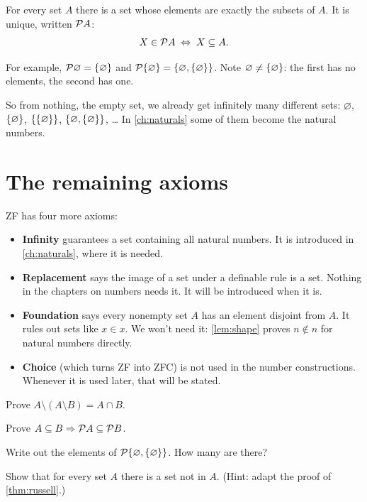 \begin{axiom}
\label{ax:power}
For every set $A$ there is a set whose elements are exactly the subsets of $A$.
It is unique, written $\mathcal{P} A$:
\[
  X \in \mathcal{P} A \;\Leftrightarrow\; X \subseteq A.
\]
\end{axiom}

For example, $\mathcal{P} \varnothing = \lbrace \varnothing \rbrace$ and $\mathcal{P} \lbrace \varnothing \rbrace
= \lbrace \varnothing, \lbrace \varnothing \rbrace \rbrace$. Note $\varnothing \neq
\lbrace \varnothing \rbrace$: the first has no elements, the second has one.

So from nothing, the empty set, we already get infinitely many different sets:
$\varnothing$, $\lbrace \varnothing \rbrace$, $\lbrace \lbrace \varnothing \rbrace \rbrace$, $\lbrace \varnothing,
\lbrace \varnothing \rbrace \rbrace$, \dots{} In \cref{ch:naturals} some of them become the
natural numbers.

\section{The remaining axioms}

ZF has four more axioms:
\begin{itemize}
  \item \textbf{Infinity} guarantees a set containing all natural numbers. It is
    introduced in \cref{ch:naturals}, where it is needed.
  \item \textbf{Replacement} says the image of a set under a definable rule is a
    set. Nothing in the chapters on numbers needs it. It will be introduced when
    it is.
  \item \textbf{Foundation} says every nonempty set $A$ has an element disjoint
    from $A$. It rules out sets like $x \in x$. We won't need it:
    \cref{lem:shape} proves $n \notin n$ for natural numbers directly.
  \item \textbf{Choice} (which turns ZF into ZFC) is not used in the number
    constructions. Whenever it is used later, that will be stated.
\end{itemize}

\begin{exercises}
  \item Prove $A \setminus (A \setminus B) = A \cap B$.
  \item Prove $A \subseteq B \Rightarrow \mathcal{P} A \subseteq \mathcal{P} B$.
  \item Write out the elements of $\mathcal{P} \lbrace \varnothing, \lbrace \varnothing \rbrace \rbrace$. How
    many are there?
  \item Show that for every set $A$ there is a set not in $A$. (Hint: adapt the
    proof of \cref{thm:russell}.)
\end{exercises}

